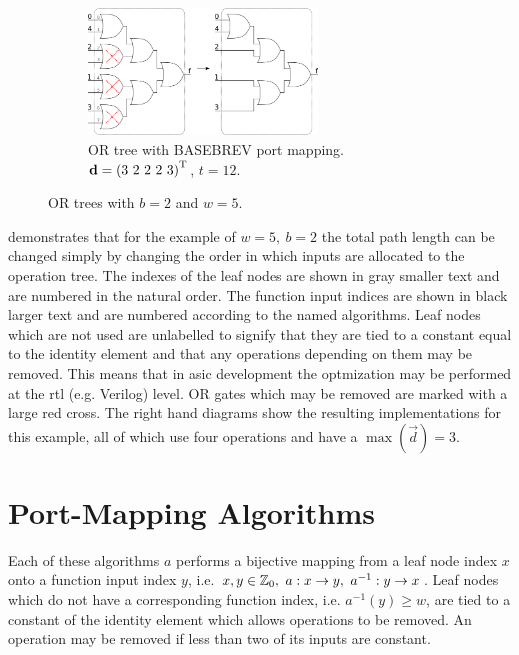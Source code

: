 \documentclass[11pt,twoside]{article}
\begin{document}
\begin{figure}[h]
    \begin{subfigure}[t]{0.9\textwidth}
        \centering
        \includegraphics[width=0.67\textwidth]{OR_b2_w5_BASEBREV.png}
        \caption{OR tree with BASEBREV port mapping.
                 $\mathbf{d} = {(3\ 2\ 2\ 2\ 3)}^\mathrm{T}$,
                 $t = 12$.
                 \label{fig:OR_b2_w5_BASEBREV}}
    \end{subfigure}

    \caption{OR trees with $b=2$ and $w=5$. \label{fig:OR_b2_w5}}
\end{figure}

 demonstrates that for the example of $w=5,\ b=2$ the
total path length can be changed simply by changing the order in which inputs
are allocated to the operation tree.
The indexes of the leaf nodes are shown in gray smaller text and are numbered
in the natural order.
The function input indices are shown in black larger text and are numbered
according to the named algorithms.
Leaf nodes which are not used are unlabelled to signify that they are tied to a
constant equal to the identity element and that any operations depending on
them may be removed.
This means that in \gls{asic} development the optmization may be performed at
the \gls{rtl} (e.g. Verilog) level.
OR gates which may be removed are marked with a large red cross.
The right hand diagrams show the resulting implementations for this example, all
of which use four operations and have a $\max(\vec{d}) = 3$.

\clearpage
\section{Port-Mapping Algorithms}

Each of these algorithms $a$ performs a bijective mapping from a leaf node
index $x$ onto a function input index $y$,
i.e. $x,y \in \integers_0,\ a: x \to y,\ a^{-1}: y \to x$.
Leaf nodes which do not have a corresponding function index,
i.e. $a^{-1}(y) \geq w$, are tied to a constant of the identity element which
allows operations to be removed.
An operation may be removed if less than two of its inputs are constant.
\end{document}
